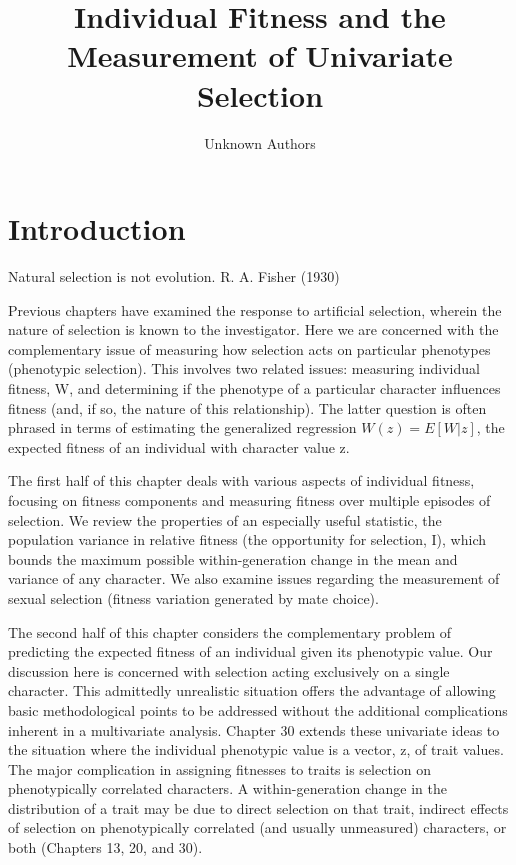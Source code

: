 \documentclass{article}
\title{Individual Fitness and the
Measurement of Univariate Selection}
\author{Unknown Authors}
\date{}
\begin{document}
\maketitle

\begin{abstract}

\end{abstract}

\section{Introduction}
Natural selection is not evolution. R. A. Fisher (1930)

Previous chapters have examined the response to artificial selection, wherein the nature of selection is known to the investigator. Here we are concerned with the complementary issue of measuring how selection acts on particular phenotypes (phenotypic selection). This involves two related issues: measuring individual fitness, W, and determining if the phenotype of a particular character influences fitness (and, if so, the nature of this relationship). The latter question is often phrased in terms of estimating the generalized regression  $ W(z) = E[W | z] $, the expected fitness of an individual with character value z.

The first half of this chapter deals with various aspects of individual fitness, focusing on fitness components and measuring fitness over multiple episodes of selection. We review the properties of an especially useful statistic, the population variance in relative fitness (the opportunity for selection, I), which bounds the maximum possible within-generation change in the mean and variance of any character. We also examine issues regarding the measurement of sexual selection (fitness variation generated by mate choice).

The second half of this chapter considers the complementary problem of predicting the expected fitness of an individual given its phenotypic value. Our discussion here is concerned with selection acting exclusively on a single character. This admittedly unrealistic situation offers the advantage of allowing basic methodological points to be addressed without the additional complications inherent in a multivariate analysis. Chapter 30 extends these univariate ideas to the situation where the individual phenotypic value is a vector, z, of trait values. The major complication in assigning fitnesses to traits is selection on phenotypically correlated characters. A within-generation change in the distribution of a trait may be due to direct selection on that trait, indirect effects of selection on phenotypically correlated (and usually unmeasured) characters, or both (Chapters 13, 20, and 30).
\end{document}
